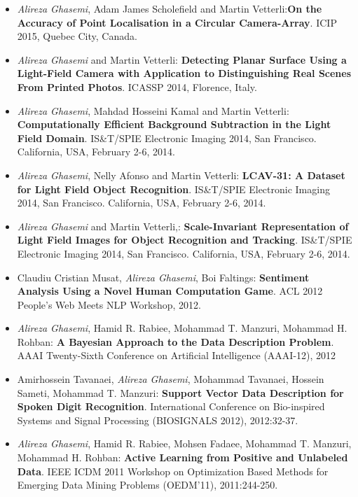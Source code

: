 \documentclass[11pt,a4paper,sans]{moderncv}        %
\begin{document}
{
\begin{itemize}
\item \textit{Alireza Ghasemi}, Adam James Scholefield and Martin Vetterli:\textbf{On the Accuracy of Point Localisation in a Circular Camera-Array}.  ICIP 2015, Quebec City, Canada.


\item \textit{Alireza Ghasemi} and Martin Vetterli:\textbf{ Detecting Planar Surface Using a Light-Field Camera with Application
to Distinguishing Real Scenes From Printed Photos}.  ICASSP 2014, Florence, Italy.

\item \textit{Alireza Ghasemi}, Mahdad Hosseini Kamal  and Martin Vetterli: \textbf{Computationally Efficient Background Subtraction in the Light Field Domain}.  IS\&T/SPIE Electronic Imaging 2014, San Francisco. California, USA, February 2-6, 2014.

\item \textit{Alireza Ghasemi}, Nelly Afonso  and Martin Vetterli: \textbf{LCAV-31: A Dataset for Light Field Object Recognition}.  IS\&T/SPIE Electronic Imaging 2014, San Francisco. California, USA, February 2-6, 2014.

\item \textit{Alireza Ghasemi} and Martin Vetterli,: \textbf{Scale-Invariant Representation of Light Field Images for Object Recognition and Tracking}.  IS\&T/SPIE Electronic Imaging 2014, San Francisco. California, USA, February 2-6, 2014.



\item Claudiu Cristian Musat, \textit{Alireza Ghasemi}, Boi Faltings: \textbf{Sentiment Analysis Using a Novel Human Computation Game}.  ACL 2012 People's Web Meets NLP Workshop, 2012.

\item \textit{Alireza Ghasemi}, Hamid R. Rabiee,  Mohammad T. Manzuri, Mohammad H. Rohban:\textbf{ A Bayesian Approach to the Data Description Problem}.  AAAI Twenty-Sixth Conference on Artificial Intelligence (AAAI-12), 2012

\item Amirhossein Tavanaei,\textit{ Alireza Ghasemi}, Mohammad Tavanaei, Hossein Sameti, Mohammad T. Manzuri: \textbf{Support Vector Data Description for Spoken Digit Recognition}. International Conference on Bio-inspired Systems and Signal Processing (BIOSIGNALS 2012), 2012:32-37.

\item \textit{Alireza Ghasemi}, Hamid R. Rabiee, Mohsen Fadaee, Mohammad T. Manzuri, Mohammad H. Rohban:\textbf{ Active Learning from Positive and Unlabeled Data}. IEEE ICDM 2011 Workshop on Optimization Based Methods for Emerging Data Mining Problems (OEDM'11), 2011:244-250.


\end{itemize}}
\end{document}
